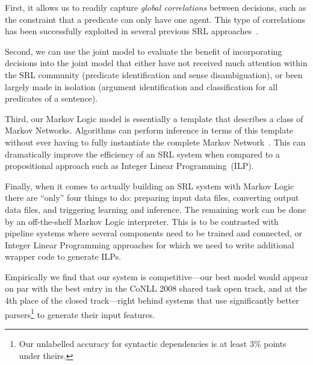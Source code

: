 First, it allows us to readily capture \emph{global correlations}
between decisions, such as the constraint that a predicate can only
have one agent. This type of correlations has been successfully 
exploited in several previous SRL approaches~\citep{toutanova05joint,punyakanok05generalized}. 

Second, we can use the joint model to evaluate the benefit of incorporating
decisions into the joint model that either have not received much
attention within the SRL community (predicate identification and sense
disambiguation), or been largely made in isolation (argument identification and classification for all predicates of a sentence). 

Third, our Markov Logic model is essentially a template that describes
a class of Markov Networks.
Algorithms can perform inference in terms of this template without
ever having to fully instantiate the complete Markov
Network~\citep{riedel08improving,singla2008lfo}. This can dramatically improve the efficiency of an SRL system when
compared to a propositional approach such as Integer Linear Programming~(ILP).


Finally, when it comes to actually building an SRL system with Markov
Logic 
there are ``only''
four things
to do: preparing input data files, converting
output data files, and triggering learning and inference. The remaining
work can be done by an off-the-shelf Markov Logic interpreter. This
is to be contrasted with pipeline systems where several components need
to be trained and connected, or Integer Linear Programming approaches for which we need
to write additional wrapper code to generate ILPs.

Empirically we find that our system is competitive---our best
model would appear on par with the best entry in the CoNLL 2008
shared task open track, and at
the 4th place of the closed track---right behind systems that use
significantly better parsers\footnote{Our unlabelled accuracy for syntactic dependencies is at least 3\% points under theirs.} to generate their input features.

